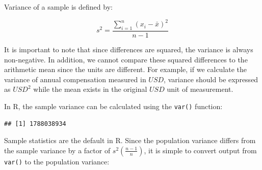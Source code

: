 \documentclass[
]{book}
\newenvironment{Shaded}{\begin{snugshade}}{\end{snugshade}}
\newcommand{\CommentTok}[1]{\textcolor[rgb]{0.56,0.35,0.01}{\textit{#1}}}
\newcommand{\DecValTok}[1]{\textcolor[rgb]{0.00,0.00,0.81}{#1}}
\newcommand{\FunctionTok}[1]{\textcolor[rgb]{0.00,0.00,0.00}{#1}}
\newcommand{\NormalTok}[1]{#1}
\newcommand{\OtherTok}[1]{\textcolor[rgb]{0.56,0.35,0.01}{#1}}
\newcommand{\SpecialCharTok}[1]{\textcolor[rgb]{0.00,0.00,0.00}{#1}}
\newcommand{\StringTok}[1]{\textcolor[rgb]{0.31,0.60,0.02}{#1}}
\begin{document}
Variance of a sample is defined by:

\[ s^{2} = \frac{\displaystyle\sum_{i=1}^{n} (x_{i}-\bar{x})^{2}}{n-1} \]

It is important to note that since differences are squared, the variance is always non-negative. In addition, we cannot compare these squared differences to the arithmetic mean since the units are different. For example, if we calculate the variance of annual compensation measured in \(USD\), variance should be expressed as \(USD^2\) while the mean exists in the original \(USD\) unit of measurement.

In R, the sample variance can be calculated using the \texttt{var()} function:

\begin{Shaded}
\end{Shaded}

\begin{verbatim}
## [1] 1788038934
\end{verbatim}

Sample statistics are the default in R. Since the population variance differs from the sample variance by a factor of \(s^2 (\frac{n - 1}{n})\), it is simple to convert output from \texttt{var()} to the population variance:

\begin{Shaded}
\end{Shaded}
\end{document}
